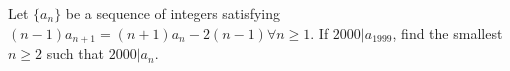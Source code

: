 Let $\{a_n\}$ be a sequence of integers satisfying $(n-1)a_{n+1}=(n+1)a_n-2(n-1) \forall n\ge 1$. If $2000|a_{1999}$, find the smallest $n\ge 2$ such that $2000|a_n$.
